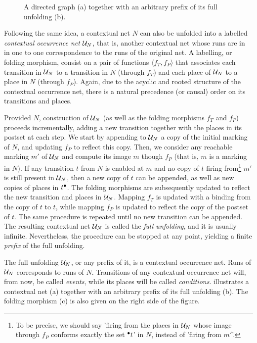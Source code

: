 \documentclass[11pt,a4paper]{article}
\begin{document}
\begin{figure}
\caption{A directed graph (a) together with an arbitrary prefix of its full
unfolding (b).}
\label{fig:a.directed}
\end{figure}

Following the same idea, a contextual net $N$ can also be unfolded into a
labelled \emph{contextual occurrence net} $\mathcal{U}_{N}$, that is, another contextual
net whose runs are in in one to one correspondence to the runs of the original
net.  A labelling, or folding morphism, consist on a pair of functions $\langle
f_T, f_P \rangle$ that associates each transition in $\mathcal{U}_{N}$ to a transition
in $N$ (through $f_T$) and each place of $\mathcal{U}_{N}$ to a place in $N$ (through
$f_P$).  Again, due to the acyclic and rooted structure of the contextual
occurrence net, there is a natural precedence (or causal) order on its
transitions and places.

Provided $N$, construction of $\mathcal{U}_{N}$ (as well as the folding morphisms $f_T$
and $f_P$) proceeds incrementally, adding a new transition together with the
places in its postset at each step.  We start by appending to $\mathcal{U}_{N}$ a copy
of the initial marking of $N$, and updating $f_P$ to reflect this copy.  Then,
we consider any reachable marking $m'$ of $\mathcal{U}_{N}$ and compute its image $m$
though $f_P$ (that is, $m$ is a marking in $N$).  If any transition $t$ from
$N$ is enabled at $m$ and no copy of $t$ firing from\footnote{To be precise, we
should say 'firing from the places in $\mathcal{U}_{N}$ whose image through $f_P$
conforms exactly the set ${}^\bullet t$' in $N$, instead of 'firing from $m'$'.} $m'$
is still present in $\mathcal{U}_{N}$, then a new copy of $t$ can be appended, as well
as new copies of places in $t^\bullet$.  The folding morphisms are subsequently
updated to reflect the new transition and places in $\mathcal{U}_{N}$.  Mapping $f_T$ is
updated with a binding from the copy of $t$ to $t$, while mapping $f_P$ is
updated to reflect the copy of the postset of $t$.  The same procedure is
repeated until no new transition can be appended.  The resulting contextual net
$\mathcal{U}_{N}$ is called the \emph{full unfolding}, and it is usually infinite.
Nevertheless, the procedure can be stopped at any point, yielding a finite
\emph{prefix} of the full unfolding.

The full unfolding $\mathcal{U}_{N}$, or any prefix of it, is a contextual occurrence
net.  Runs of $\mathcal{U}_{N}$ corresponds to runs of $N$.  
Transitions of any contextual occurrence net will, from now, be called
\emph{events}, while its places will be called \emph{conditions}.
 illustrates a contextual net (a) together with an arbitrary
prefix of its full unfolding (b).  The folding morphism (c) is also given on
the right side of the figure.
\end{document}
